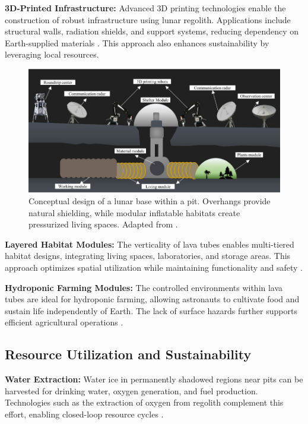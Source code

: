 \textbf{3D-Printed Infrastructure:}
Advanced 3D printing technologies enable the construction of robust infrastructure using lunar regolith. Applications include structural walls, radiation shields, and support systems, reducing dependency on Earth-supplied materials \cite{jsanders-isru}. This approach also enhances sustainability by leveraging local resources.

\begin{figure}[H]
    \centering
    \includegraphics[width=0.8\linewidth]{simple-base-schema.png}
    \caption{Conceptual design of a lunar base within a pit. Overhangs provide natural shielding, while modular inflatable habitats create pressurized living spaces. Adapted from \cite{bases-feng}.}
    \label{fig:lunar-habitat}
\end{figure}

\textbf{Layered Habitat Modules:}
The verticality of lava tubes enables multi-tiered habitat designs, integrating living spaces, laboratories, and storage areas. This approach optimizes spatial utilization while maintaining functionality and safety \cite{sublunear-lava}.

\textbf{Hydroponic Farming Modules:}
The controlled environments within lava tubes are ideal for hydroponic farming, allowing astronauts to cultivate food and sustain life independently of Earth. The lack of surface hazards further supports efficient agricultural operations \cite{bases-feng}.

\subsection{Resource Utilization and Sustainability}

\textbf{Water Extraction:}
Water ice in permanently shadowed regions near pits can be harvested for drinking water, oxygen generation, and fuel production. Technologies such as the extraction of oxygen from regolith complement this effort, enabling closed-loop resource cycles \cite{jsanders-isru}.

